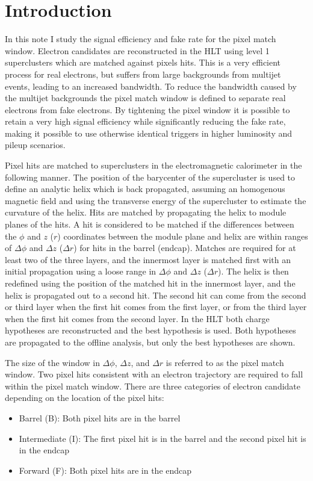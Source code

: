 \section{Introduction}

In this note I study the signal efficiency and fake rate for the pixel match window.  Electron candidates are reconstructed in the HLT using level 1 superclusters which are matched against pixels hits.  This is a very efficient process for real electrons, but suffers from large backgrounds from multijet events, leading to an increased bandwidth.  To reduce the bandwidth caused by the multijet backgrounds the pixel match window is defined to separate real electrons from fake electrons.  By tightening the pixel window it is possible to retain a very high signal efficiency while significantly reducing the fake rate, making it possible to use otherwise identical triggers in higher luminosity and pileup scenarios.

Pixel hits are matched to superclusters in the electromagnetic calorimeter in the following manner.  The position of the barycenter of the supercluster is used to define an analytic helix which is back propagated, assuming an homogenous magnetic field and using the transverse energy of the supercluster to estimate the curvature of the helix.  Hits are matched by propagating the helix to module planes of the hits.  A hit is considered to be matched if the differences between the $\phi$ and $z$ ($r$) coordinates between the module plane and helix are within ranges of $\Delta\phi$ and $\Delta z$ ($\Delta r$) for hits in the barrel (endcap).  Matches are required for at least two of the three layers, and the innermost layer is matched first with an initial propagation using a loose range in $\Delta\phi$ and $\Delta z$ ($\Delta r$).  The helix is then redefined using the position of the matched hit in the innermost layer, and the helix is propagated out to a second hit.  The second hit can come from the second or third layer when the first hit comes from the first layer, or from the third layer when the first hit comes from the second layer.  In the HLT both charge hypotheses are reconstructed and the best hypothesis is used.  Both hypotheses are propagated to the offline analysis, but only the best hypotheses are shown.

The size of the window in $\Delta\phi$, $\Delta z$, and $\Delta r$ is referred to as the pixel match window.  Two pixel hits consistent with an electron trajectory are required to fall within the pixel match window.  There are three categories of electron candidate depending on the location of the pixel hits:
\begin{itemize}
  \item Barrel (B): Both pixel hits are in the barrel
  \item Intermediate (I): The first pixel hit is in the barrel and the second pixel hit is in the endcap
  \item Forward (F): Both pixel hits are in the endcap
  
\end{itemize}

